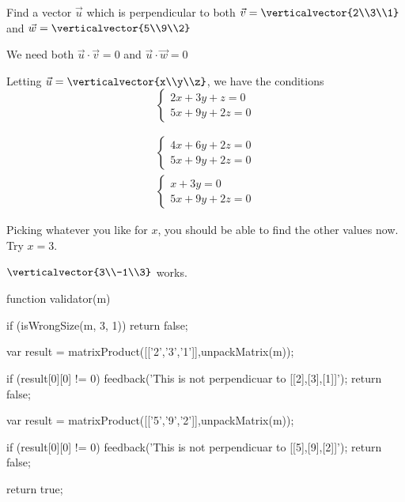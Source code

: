 \documentclass{ximera}
\begin{document}
\begin{question}
  Find a vector $\vec{u}$ which is perpendicular to both $\vec{v} = \verticalvector{2\\3\\1}$ and $\vec{w} = \verticalvector{5\\9\\2}$
  \begin{solution}
    \begin{hint}
      We need both $\vec{u} \cdot \vec{v}=0 $ and $\vec{u}\cdot \vec{w}=0$
    \end{hint}
    \begin{hint}
      Letting $\vec{u} = \verticalvector{x\\y\\z}$, we have the conditions
      \[
      \begin{cases}
        2x+3y+z=0\\
        5x+9y+2z=0
      \end{cases}
      \]
    \end{hint}
    \begin{hint}
      \begin{align*}
        \begin{cases}
          4x+6y+2z=0\\
          5x+9y+2z=0
        \end{cases}
        \\
        \begin{cases}
          x+3y = 0\\
          5x+9y+2z=0
        \end{cases}
      \end{align*}
    \end{hint}
    \begin{hint}
      Picking whatever you like for $x$, you should be able to find the other values now.  Try $x=3$.
    \end{hint}
    \begin{hint}
      $\verticalvector{3\\-1\\3}$ works.
    \end{hint}
    \begin{matrix-answer}
    function validator(m) {
      if (isWrongSize(m, 3, 1)) return false;

      var result = matrixProduct([['2','3','1']],unpackMatrix(m));

      if (result[0][0] != 0) {
        feedback('This is not perpendicuar to [[2],[3],[1]]');
        return false;
      }

      var result = matrixProduct([['5','9','2']],unpackMatrix(m));

      if (result[0][0] != 0) {
        feedback('This is not perpendicuar to [[5],[9],[2]]');
        return false;
      }

      return true;
    }
    \end{matrix-answer}
  \end{solution}
\end{question}
    
\end{document}
